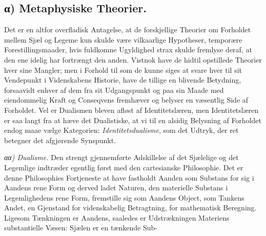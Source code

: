 \documentclass[12pt,a4paper]{book}
\begin{document}
\subsection*{α) Metaphysiske Theorier.}

Det er en altfor overfladisk Antagelse, at de forskjellige Theorier om Forholdet
mellem Sjæl og Legeme kun skulde være vilkaarlige Hypotheser, temporære
Forestillingsmaader, hvis fuldkomne Ugyldighed strax skulde fremlyse deraf, at
den ene idelig har fortrængt den anden. Vistnok have de hidtil opstillede
Theorier hver sine Mangler; men i Forhold til som de kunne siges at svare hver
til sit Vendepunkt i Videnskabens Historie, have de tillige en blivende
Betydning, forsaavidt enhver af dem fra sit Udgangspunkt og paa sin Maade med
eiendommelig Kraft og Conseqvens fremhæver og belyser en væsentlig Side af
Forholdet. Vel er Dualismen bleven afløst af Identitetslæren, men Identitetslæren
er saa langt fra at hæve det Dualistiske, at vi til en alsidig Belysning af
Forholdet endog maae vælge Kategorien: \emph{Identitetsdualisme}, som det Udtryk,
der ret betegner det afgjørende Synspunkt.

\emph{αα) Dualisme.} Den strengt gjennemførte Adskillelse af det Sjælelige og det
Legemlige indtræder egentlig først med den cartesianske Philosophie. Det er denne
Philosophies Fortjeneste at have fastholdt Aanden som Substans for sig i Aandens
rene Form og derved ladet Naturen, den materielle Substans i Legemlighedens rene
Form, fremstille sig som Aandens Object, som Tankens Andet, en Gjenstand for
videnskabelig Betragtning, for mathematisk Beregning. Ligesom Tænkningen er
Aandens, saaledes er Udstrækningen Materiens substantielle Væsen: Sjælen er en
tænkende Sub-
\end{document}
